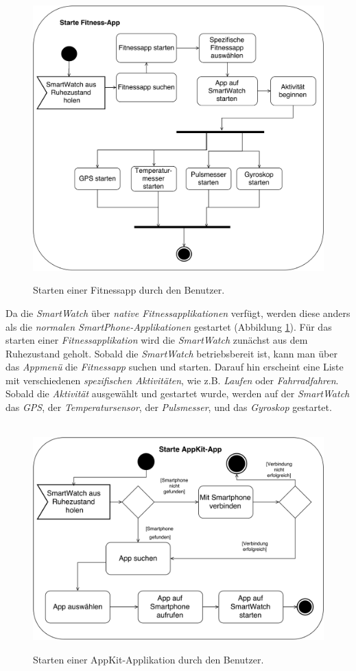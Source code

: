 \begin{figure}[h]
\centering\
\includegraphics[width=\textwidth]{img/activityFitness}
\caption{Starten einer Fitnessapp durch den Benutzer.}\label{fig:activityFitness}
\end{figure}
Da die \textit{SmartWatch} über \textit{native Fitnessapplikationen} verfügt, werden diese anders als die \textit{normalen SmartPhone-Applikationen} gestartet (Abbildung \ref{fig:activityFitness}).
Für das starten einer \textit{Fitnessapplikation} wird die \textit{SmartWatch} zunächst aus dem Ruhezustand geholt. Sobald die \textit{SmartWatch} betriebsbereit ist, kann man über das \textit{Appmenü} die \textit{Fitnessapp} suchen und starten. Darauf hin erscheint eine Liste mit verschiedenen \textit{spezifischen Aktivitäten}, wie z.B. \textit{Laufen} oder \textit{Fahrradfahren}. Sobald die \textit{Aktivität} ausgewählt und gestartet wurde, werden auf der \textit{SmartWatch} das \textit{GPS}, der \textit{Temperatursensor}, der \textit{Pulsmesser}, und das \textit{Gyroskop} gestartet. \\
\begin{figure}[h]
\centering\
\includegraphics[width=\textwidth]{img/activityAppKit}
\caption{Starten einer AppKit-Applikation durch den Benutzer.}\label{fig:activityAppKit}
\end{figure}
